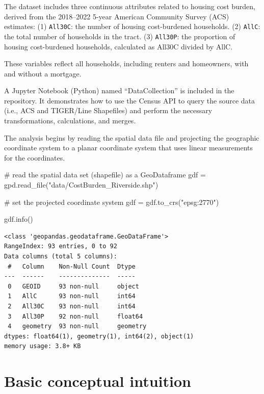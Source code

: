 \documentclass[
]{aft}
\newenvironment{Shaded}{\begin{snugshade}}{\end{snugshade}}
\newcommand{\CommentTok}[1]{\textcolor[rgb]{0.37,0.37,0.37}{#1}}
\newcommand{\NormalTok}[1]{\textcolor[rgb]{0.00,0.23,0.31}{#1}}
\newcommand{\OperatorTok}[1]{\textcolor[rgb]{0.37,0.37,0.37}{#1}}
\newcommand{\StringTok}[1]{\textcolor[rgb]{0.13,0.47,0.30}{#1}}
\begin{document}
The dataset includes three continuous attributes related to housing cost
burden, derived from the 2018--2022 5-year American Community Survey
(ACS) estimates: (1) \texttt{All30C}: the number of housing
cost-burdened households. (2) \texttt{AllC}: the total number of
households in the tract. (3) \texttt{All30P}: the proportion of housing
cost-burdened households, calculated as All30C divided by AllC.

These variables reflect all households, including renters and
homeowners, with and without a mortgage.

A Jupyter Notebook (Python) named ``DataCollection'' is included in the
repository. It demonstrates how to use the Census API to query the
source data (i.e., ACS and TIGER/Line Shapefiles) and perform the
necessary transformations, calculations, and merges.

The analysis begins by reading the spatial data file and projecting the
geographic coordinate system to a planar coordinate system that uses
linear measurements for the coordinates.

\begin{Shaded}
\begin{Highlighting}[]
\CommentTok{\# read the spatial data set (shapefile) as a GeoDataframe}
\NormalTok{gdf }\OperatorTok{=}\NormalTok{ gpd.read\_file(}\StringTok{"data/CostBurden\_Riverside.shp"}\NormalTok{)}

\CommentTok{\# set the projected coordinate system}
\NormalTok{gdf }\OperatorTok{=}\NormalTok{ gdf.to\_crs(}\StringTok{"epsg:2770"}\NormalTok{)}

\NormalTok{gdf.info()}
\end{Highlighting}
\end{Shaded}

\begin{verbatim}
<class 'geopandas.geodataframe.GeoDataFrame'>
RangeIndex: 93 entries, 0 to 92
Data columns (total 5 columns):
 #   Column    Non-Null Count  Dtype   
---  ------    --------------  -----   
 0   GEOID     93 non-null     object  
 1   AllC      93 non-null     int64   
 2   All30C    93 non-null     int64   
 3   All30P    92 non-null     float64 
 4   geometry  93 non-null     geometry
dtypes: float64(1), geometry(1), int64(2), object(1)
memory usage: 3.8+ KB
\end{verbatim}

\section{Basic conceptual intuition}\label{sec-intuition}
\end{document}
